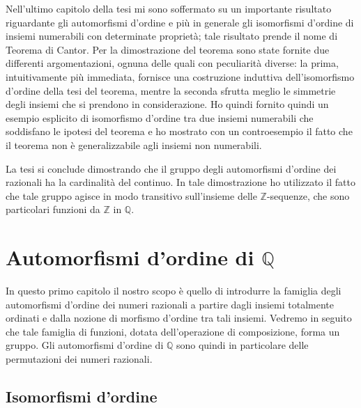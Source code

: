 \documentclass[12pt,a4paper,openright]{report}
\newcommand{\Z}{\mathbb{Z}} %
\newcommand{\Q}{\mathbb{Q}} %
\newcommand{\0}{\setminus\{0\}} %
\theoremstyle{definition}
\theoremstyle{plain}
\begin{document}
Nell'ultimo capitolo della tesi mi sono soffermato su un importante risultato riguardante gli automorfismi d'ordine e più in generale gli isomorfismi d'ordine di insiemi numerabili con determinate proprietà; tale risultato prende il nome di Teorema di Cantor.
Per la dimostrazione del teorema sono state fornite due differenti argomentazioni, ognuna delle quali con peculiarità diverse: la prima, intuitivamente più immediata, fornisce una costruzione induttiva dell'isomorfismo d'ordine della tesi del teorema, mentre la seconda sfrutta meglio le simmetrie degli insiemi che si prendono in considerazione.
Ho quindi fornito quindi un esempio esplicito di isomorfismo d'ordine tra due insiemi numerabili che soddisfano le ipotesi del teorema e ho mostrato con un controesempio il fatto che il teorema non è generalizzabile agli insiemi non numerabili.

La tesi si conclude dimostrando che il gruppo degli automorfismi d'ordine dei razionali ha la cardinalità del continuo. In tale dimostrazione ho utilizzato il fatto che tale gruppo agisce in modo transitivo sull'insieme delle $\Z$-sequenze, che sono particolari funzioni da $\Z$ in $\Q$.

\clearpage{\pagestyle{empty}\cleardoublepage}

\lhead[\fancyplain{}{\bfseries\thepage}]{\fancyplain{}{\bfseries\rightmark}}


\chapter{Automorfismi d'ordine di $\Q$}

In questo primo capitolo il nostro scopo è quello di introdurre la famiglia degli automorfismi d'ordine dei numeri razionali a partire dagli insiemi totalmente ordinati e dalla nozione di morfismo d'ordine tra tali insiemi. Vedremo in seguito che tale famiglia di funzioni, dotata dell'operazione di composizione, forma un gruppo. Gli automorfismi d'ordine di $\Q$ sono quindi in particolare delle permutazioni dei numeri razionali.

\section{Isomorfismi d'ordine}
\end{document}

